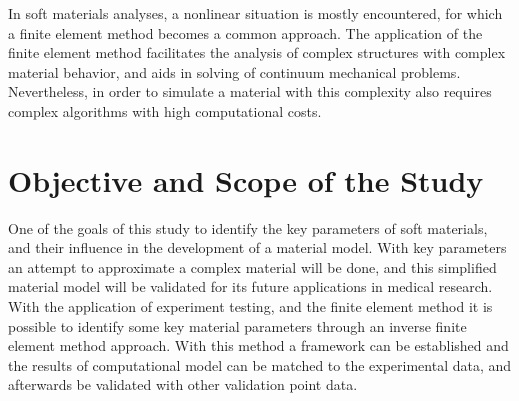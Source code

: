In soft materials analyses, a nonlinear situation is mostly encountered, for which a finite 
element method becomes a common approach. The application of the finite element method
 facilitates the analysis of complex structures with complex material behavior, and aids in 
 solving of continuum mechanical problems. Nevertheless, in order to simulate a material with 
 this complexity also requires complex algorithms with high computational costs. \\

 \section{Objective and Scope of the Study} 
One of the goals of this study to identify the key parameters of soft materials, and their 
influence in the development of a material model. With key parameters an attempt to 
 approximate a complex material will be done, and this simplified material model will be 
 validated for its future applications in medical research.\\
 
 With the application of experiment testing, and the finite element method it is possible 
 to identify some key material parameters through an inverse finite element method approach. With this 
 method a framework can be established and the results of computational model can be matched 
 to the experimental data, and afterwards be validated with other validation point data.


